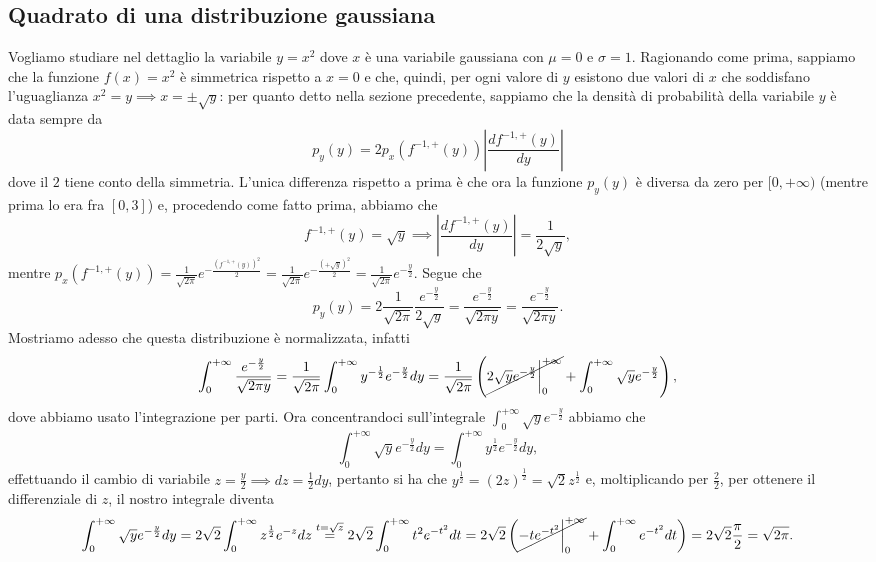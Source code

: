 \documentclass{report}
\begin{document}
\subsection{Quadrato di una distribuzione gaussiana}

Vogliamo studiare nel dettaglio la variabile $y = x^2$ dove $x$ è una variabile gaussiana con $\mu = 0$ e $\sigma = 1$. Ragionando come prima, sappiamo che la funzione $f(x) = x^2$ è simmetrica rispetto a $x = 0$ e che, quindi, per ogni valore di $y$ esistono due valori di $x$ che soddisfano l'uguaglianza $x^2 = y \implies x = \pm \sqrt{y}$: per quanto detto nella sezione precedente, sappiamo che la densità di probabilità della variabile $y$ è data sempre da
$$
p_y(y) = 2p_x(f^{-1, +}(y)) \left| \frac{df^{-1, +}(y)}{dy} \right|
$$
dove il $2$ tiene conto della simmetria. L'unica differenza rispetto a prima è che ora la funzione $p_y(y)$ è diversa da zero per $[0, +\infty)$ (mentre prima lo era fra $[0, 3]$) e, procedendo come fatto prima, abbiamo che
$$
f^{-1, +}(y) = \sqrt{y} \implies \left| \frac{df^{-1, +}(y)}{dy} \right| = \frac{1}{2\sqrt{y}},
$$
mentre $p_x(f^{-1, +}(y)) = \frac{1}{\sqrt{2\pi}}e^{-\frac{(f^{-1, +}(y))^2}{2}} = \frac{1}{\sqrt{2\pi}} e^{-\frac{(+\sqrt{y})^2}{2}} = \frac{1}{\sqrt{2\pi}} e^{-\frac{y}{2}}$. Segue che
$$
p_y(y) = 2 \frac{1}{\sqrt{2 \pi}} \frac{e^{-\frac{y}{2}}}{2\sqrt{y}} = \frac{e^{-\frac{y}{2}}}{\sqrt{2 \pi y}} = \frac{e^{-\frac{y}{2}}}{\sqrt{2 \pi y}}.
$$
Mostriamo adesso che questa distribuzione è normalizzata, infatti
$$
	\int_0^{+\infty} \frac{e^{-\frac{y}{2}}}{\sqrt{2 \pi y}} = \frac{1}{\sqrt{2 \pi}} \int_0^{+\infty} y^{-\frac{1}{2}} e^{-\frac{y}{2}} dy = \frac{1}{\sqrt{2 \pi}} \left( \cancel{2 \sqrt{y} e^{-\frac{y}{2}}\bigg|^{+\infty}_0} + \int_0^{+\infty} \sqrt{y}e^{-\frac{y}{2}} \right),
$$
dove abbiamo usato l'integrazione per parti. Ora concentrandoci sull'integrale $\int_0^{+\infty} \sqrt{y} e^{-\frac{y}{2}}$ abbiamo che
$$
		\int_0^{+\infty} \sqrt{y} e^{-\frac{y}{2}}dy = \int_0^{+\infty} y^{\frac{1}{2}} e^{-\frac{y}{2}}dy, 
$$
effettuando il cambio di variabile $z = \frac{y}{2} \implies dz = \frac{1}{2} dy$, pertanto si ha che $y^{\frac{1}{2}} = (2z)^{\frac{1}{2}} = \sqrt{2} z^{\frac{1}{2}}$ e, moltiplicando per $\frac{2}{2}$, per ottenere il differenziale di $z$, il nostro integrale diventa
$$
		\int_0^{+\infty} \sqrt{y} e^{-\frac{y}{2}}dy = 2 \sqrt{2} \int_0^{+\infty} z^{\frac{1}{2}} e^{-z}dz \stackrel{t=\sqrt{z}}{=} 2 \sqrt{2} \int_0^{+\infty} t^2 e^{-t^2} dt = 2 \sqrt{2} \left(\cancel{-te^{-t^2}\bigg|^{+\infty}_0} + \int_0^{+\infty} e^{-t^2}dt \right) = 2 \sqrt{2} \frac{\pi}{2}  = \sqrt{2 \pi}. 
$$
\end{document}
